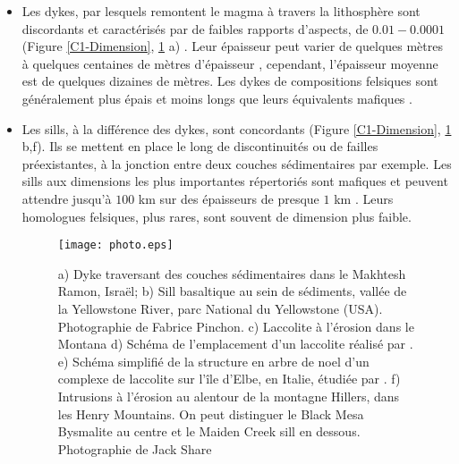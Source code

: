 \begin{itemize}
\item  Les  dykes,  par  lesquels  remontent le  magma  à  travers  la
  lithosphère sont discordants et caractérisés par de faibles rapports
  d'aspects,    de     $0.01-0.0001$    (Figure    \ref{C1-Dimension},
  \ref{C1-picture}                                                  a)
  \citep{Rubin:1995upa,Schultz:2008ih,Kavanagh:2011kf}.           Leur
  épaisseur peut  varier de  quelques mètres  à quelques  centaines de
  mètres  d'épaisseur \citep{Walker:1989jq,Krumbholz:2014dj},  cependant,
  l'épaisseur moyenne est de quelques dizaines de mètres. Les dykes de
  compositions felsiques  sont généralement plus épais  et moins longs
  que leurs équivalents mafiques \citep{Rubin:1995upa}.

\item Les sills,  à la différence des dykes,  sont concordants (Figure
  \ref{C1-Dimension}, \ref{C1-picture} b,f).  Ils  se mettent en place
  le long de discontinuités ou de failles préexistantes, à la jonction
  entre  deux  couches  sédimentaires  par  exemple.   Les  sills  aux
  dimensions les plus importantes répertoriés sont mafiques et peuvent
  attendre  jusqu'à $100$  km sur  des  épaisseurs de  presque $1$  km
  \citep{Cruden:tg}.   Leurs homologues  felsiques,  plus rares,  sont
  souvent de dimension plus faible.

  \begin{figure}[htpb]
    \begin{center}
      \graphicspath{ {/Users/thorey/Documents/These/Manuscript/Figure/Chapter1/} }
      \texttt{[image: photo.eps]}
      \caption{a) Dyke  traversant des  couches sédimentaires  dans le
        Makhtesh  Ramon,  Israël;  b)   Sill  basaltique  au  sein  de
        sédiments, vallée  de la  Yellowstone River, parc  National du
        Yellowstone  (USA).   Photographie  de  Fabrice  Pinchon.   c)
        Laccolite   à  l'érosion   dans  le   Montana  d)   Schéma  de
        l'emplacement       d'un      laccolite       réalisé      par
        \citet{Gilbert:1877uk}. e) Schéma simplifié de la structure en
        arbre de noel d'un complexe  de laccolite sur l'île d'Elbe, en
        Italie,  étudiée par  \citet{Rocchi:2010dn}.  f)  Intrusions à
        l'érosion au alentour  de la montagne Hillers,  dans les Henry
        Mountains.   On peut  distinguer  le Black  Mesa Bysmalite  au
        centre et  le Maiden Creek  sill en dessous.   Photographie de
        Jack Share}
      \label{C1-picture}
    \end{center}
  \end{figure}


\end{itemize}
